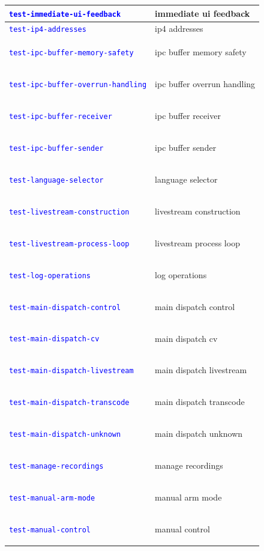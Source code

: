 \documentclass[12pt, titlepage]{article}
\newcommand{\tiddef}[1]{\hypertarget{tid:#1}{\textcolor{blue}{\texttt{#1}}}}
\begin{document}
\begin{longtable}{|>{\raggedright\arraybackslash}p{5cm}|>{\raggedright\arraybackslash}p{9cm}|}
  \tiddef{test-immediate-ui-feedback}                  & immediate ui feedback                  \\ \hline
  \tiddef{test-ip4-addresses}                          & ip4 addresses                          \\ \hline
  \tiddef{test-ipc-buffer-memory-safety}               & ipc buffer memory safety               \\ \hline
  \tiddef{test-ipc-buffer-overrun-handling}            & ipc buffer overrun handling            \\ \hline
  \tiddef{test-ipc-buffer-receiver}                    & ipc buffer receiver                    \\ \hline
  \tiddef{test-ipc-buffer-sender}                      & ipc buffer sender                      \\ \hline
  \tiddef{test-language-selector}                      & language selector                      \\ \hline
  \tiddef{test-livestream-construction}                & livestream construction                \\ \hline
  \tiddef{test-livestream-process-loop}                & livestream process loop                \\ \hline
  \tiddef{test-log-operations}                         & log operations                         \\ \hline
  \tiddef{test-main-dispatch-control}                  & main dispatch control                  \\ \hline
  \tiddef{test-main-dispatch-cv}                       & main dispatch cv                       \\ \hline
  \tiddef{test-main-dispatch-livestream}               & main dispatch livestream               \\ \hline
  \tiddef{test-main-dispatch-transcode}                & main dispatch transcode                \\ \hline
  \tiddef{test-main-dispatch-unknown}                  & main dispatch unknown                  \\ \hline
  \tiddef{test-manage-recordings}                      & manage recordings                      \\ \hline
  \tiddef{test-manual-arm-mode}                        & manual arm mode                        \\ \hline
  \tiddef{test-manual-control}                         & manual control                         \\ \hline

\end{longtable}
\end{document}
